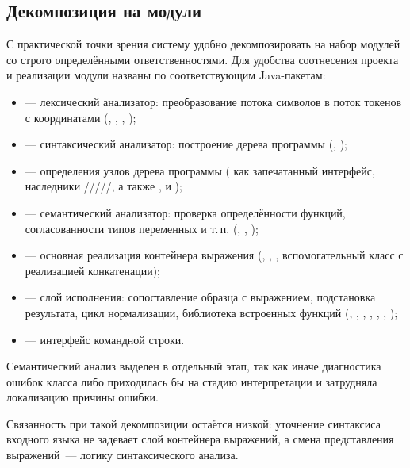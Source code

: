 \subsection{Декомпозиция на модули}
\label{subsec:modules}

С практической точки зрения систему удобно декомпозировать на набор модулей со строго
определёнными ответственностями. Для удобства соотнесения проекта и реализации модули
названы по соответствующим Java-пакетам:
\begin{itemize}
  \item {} --- лексический анализатор: преобразование потока символов в поток
        токенов с координатами (, , , );
  \item {} --- синтаксический анализатор: построение дерева программы
        (, );
  \item {} --- определения узлов дерева программы ( как
        запечатанный интерфейс, наследники /////,
        а также ,  и );
  \item {} --- семантический анализатор: проверка определённости функций,
        согласованности типов переменных и т.\,п. (, ,
        );
  \item {} --- основная реализация контейнера выражения (,
        , , вспомогательный класс 
        с реализацией конкатенации);
  \item {} --- слой исполнения: сопоставление образца с выражением,
        подстановка результата, цикл нормализации, библиотека встроенных функций
        (, , , , ,
        , );
  \item {} --- интерфейс командной строки.
\end{itemize}

Семантический анализ выделен в отдельный этап, так как иначе диагностика ошибок класса  либо  приходилась бы на
стадию интерпретации и затрудняла локализацию причины ошибки.

Связанность при такой декомпозиции остаётся низкой: уточнение синтаксиса входного языка не задевает слой контейнера выражений,
а смена представления выражений~--- логику синтаксического анализа.

